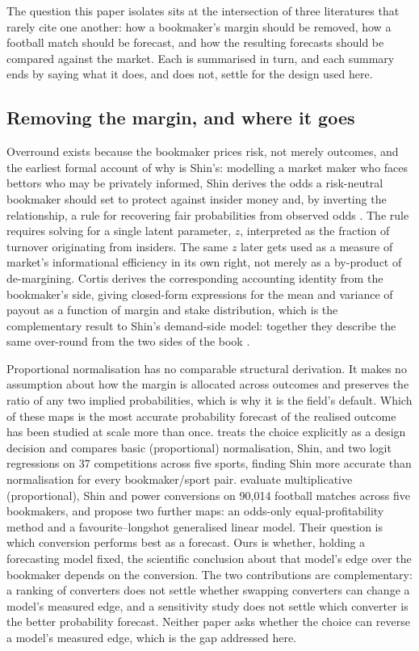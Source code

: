 \documentclass[11pt,a4paper]{article}
\begin{document}
The question this paper isolates sits at the intersection of three literatures
that rarely cite one another: how a bookmaker's margin should be removed, how
a football match should be forecast, and how the resulting forecasts should be
compared against the market. Each is summarised in turn, and each summary ends
by saying what it does, and does not, settle for the design used here.

\subsection{Removing the margin, and where it goes}

Overround exists because the bookmaker prices risk, not merely outcomes,
and the earliest formal account of why is Shin's: modelling a market maker
who faces bettors who may be privately informed, Shin derives the odds a
risk-neutral bookmaker should set to protect against insider money and, by
inverting the relationship, a rule for recovering fair probabilities from
observed odds \citep{shin1991,shin1993}. The rule requires solving for a
single latent parameter, $z$, interpreted as the fraction of turnover
originating from insiders. The same $z$ later gets used as a measure of
market's informational efficiency in its own right, not merely as a
by-product of de-margining. Cortis derives the corresponding accounting
identity from the bookmaker's side, giving closed-form expressions for the
mean and variance of payout as a function of margin and stake distribution,
which is the complementary result to Shin's demand-side model: together they
describe the same over-round from the two sides of the book
\citep{cortis2015}.

Proportional normalisation has no comparable structural derivation. It makes
no assumption about how the margin is allocated across outcomes and preserves
the ratio of any two implied probabilities, which is why it is the field's
default. Which of these maps is the most accurate probability forecast of the
realised outcome has been studied at scale more than once.
\citet{strumbelj2014} treats the choice explicitly as a design decision and
compares basic (proportional) normalisation, Shin, and two logit regressions
on 37 competitions across five sports, finding Shin more accurate than
normalisation for every bookmaker/sport pair. \citet{goto2026} evaluate
multiplicative (proportional), Shin and power conversions on 90{,}014 football
matches across five bookmakers, and propose two further maps: an odds-only
equal-profitability method and a favourite--longshot generalised linear
model. Their question is which conversion performs best as a forecast. Ours
is whether, holding a forecasting model fixed, the scientific conclusion
about that model's edge over the bookmaker depends on the conversion. The two
contributions are complementary: a ranking of converters does not settle
whether swapping converters can change a model's measured edge, and a
sensitivity study does not settle which converter is the better probability
forecast. Neither paper asks whether the choice can reverse a model's
measured edge, which is the gap addressed here.
\end{document}
